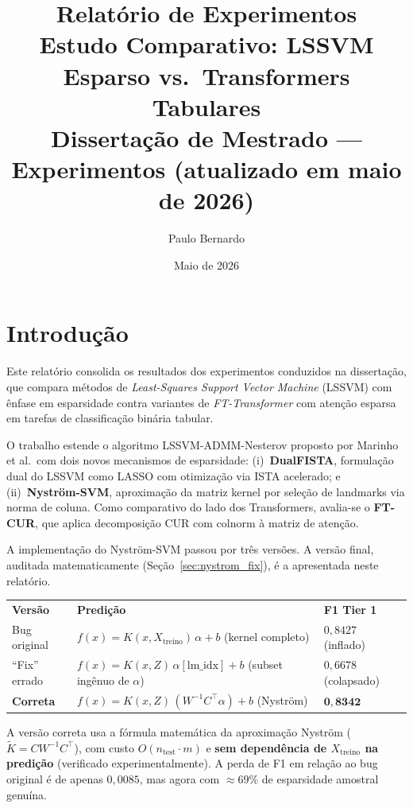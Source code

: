 \documentclass[12pt,a4paper]{article}
\title{\textbf{Relatório de Experimentos}\\[0.4em]
\large Estudo Comparativo: LSSVM Esparso vs.\ Transformers Tabulares\\[0.2em]
\normalsize Dissertação de Mestrado --- Experimentos (atualizado em maio de 2026)}
\author{Paulo Bernardo}
\date{Maio de 2026}
\begin{document}
\maketitle
\tableofcontents
\newpage

\section{Introdução}
\label{sec:intro}

Este relatório consolida os resultados dos experimentos conduzidos na dissertação,
que compara métodos de \textit{Least-Squares Support Vector Machine} (LSSVM) com
ênfase em esparsidade contra variantes de \textit{FT-Transformer} com atenção
esparsa em tarefas de classificação binária tabular.

O trabalho estende o algoritmo LSSVM-ADMM-Nesterov proposto por Marinho et al.\
com dois novos mecanismos de esparsidade: (i)~\textbf{DualFISTA}, formulação dual
do LSSVM como LASSO com otimização via ISTA acelerado; e (ii)~\textbf{Nyström-SVM},
aproximação da matriz kernel por seleção de landmarks via norma de coluna.
Como comparativo do lado dos Transformers, avalia-se o \textbf{FT-CUR}, que aplica
decomposição CUR com colnorm à matriz de atenção.

\begin{tcolorbox}[
  colback=warnbg, colframe=warnborder, title=\textbf{Auditoria do Nyström-SVM --- três versões},
  fonttitle=\bfseries, breakable
]
A implementação do Nyström-SVM passou por três versões. A versão final, auditada
matematicamente (Seção~\ref{sec:nystrom_fix}), é a apresentada neste relatório.

\begin{tabular}{lll}
\textbf{Versão} & \textbf{Predição} & \textbf{F1 Tier 1} \\
Bug original    & $f(x){=}K(x, X_\text{treino})\,\alpha + b$ (kernel completo)         & $0{,}8427$ (inflado) \\
``Fix'' errado  & $f(x){=}K(x, Z)\,\alpha[\text{lm\_idx}] + b$ (subset ingênuo de $\alpha$) & $0{,}6678$ (colapsado) \\
\textbf{Correta} & $f(x){=}K(x, Z)\,(W^{-1}C^\top\alpha) + b$ (Nyström)                & $\mathbf{0{,}8342}$ \\
\end{tabular}

A versão correta usa a fórmula matemática da aproximação Nyström
($\tilde K = CW^{-1}C^\top$), com custo $O(n_\text{test}\cdot m)$ e
\textbf{sem dependência de $X_\text{treino}$ na predição} (verificado experimentalmente).
A perda de F1 em relação ao bug original é de apenas $0{,}0085$, mas agora com
$\approx 69\%$ de esparsidade amostral genuína.
\end{tcolorbox}
\end{document}
